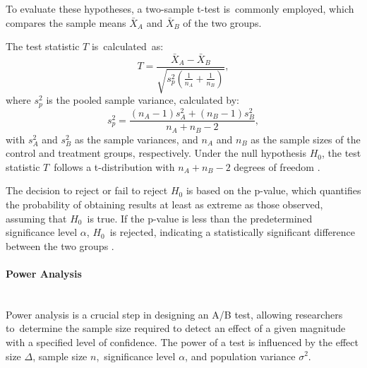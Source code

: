 \documentclass[magisterska, english]{pwr_wmat_praca_dyplomowa}
\theoremstyle{plain}
\numberwithin{theorem}{chapter}
\theoremstyle{definition}
\numberwithin{theorem}{chapter}
\newcommand{\myparagraph}[1]{\paragraph{#1}\mbox{}\\}
\begin{document}
To evaluate these hypotheses, a two-sample t-test is~commonly employed, which compares the sample means \( \bar{X}_A \) and \( \bar{X}_B \) of the two groups.

The test statistic \( T \) is~calculated~as:
\begin{equation*}
	T = \frac{\bar{X}_A - \bar{X}_B}{\sqrt{s_p^2\left(\frac{1}{n_A} + \frac{1}{n_B}\right)}},
\end{equation*}
where \( s_p^2 \) is the pooled sample variance, calculated by:
\begin{equation*}
	s_p^2 = \frac{(n_A - 1)s_A^2 + (n_B - 1)s_B^2}{n_A + n_B - 2},
\end{equation*}
with \( s_A^2 \) and \( s_B^2 \) as the sample variances, and \( n_A \) and \( n_B \) as the sample sizes of the control and treatment groups, respectively. Under the null hypothesis \( H_0 \), the test statistic \( T \)~follows a t-distribution with \( n_A + n_B - 2 \) degrees of freedom \cite{rice2007}.

The decision to reject or fail to reject \( H_0 \) is based on the p-value, which quantifies the probability of obtaining results at least as extreme as those observed, assuming that \( H_0 \)~is true. If the p-value is less than the predetermined significance level \( \alpha \), \( H_0 \)~is rejected, indicating a statistically significant difference between the two groups \cite{Student1908}.

\myparagraph{Power Analysis}

Power analysis is a crucial step in designing an A/B test, allowing researchers to~determine the sample size required to detect an effect of a given magnitude with a specified level of confidence. The power of a test is influenced by the effect size \( \Delta \), sample size \( n \),~significance level \( \alpha \), and population variance \( \sigma^2 \).
\end{document}
